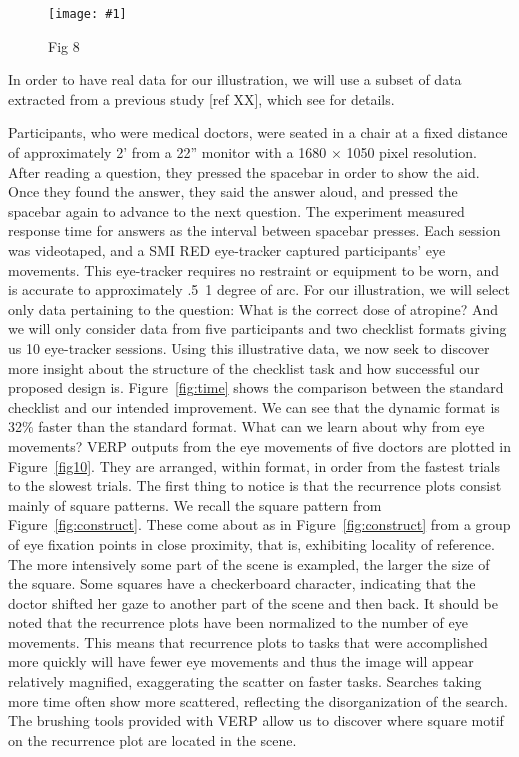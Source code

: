 \documentclass{sigchi}
\newcommand{\insertpicture}[2]{\begin{center}\texttt{[image: \#1]}\end{center}}
\begin{document}
\begin{figure}
\insertpicture{figures/dummy.eps}{0.5}
\caption{Fig 8 \label{Fig8}} 
\end{figure}

In order to have real data for our illustration, we will use a subset of
data extracted from a previous study [ref XX], which see for 
details.

Participants, who were medical doctors, were seated in a chair at a fixed
distance of approximately 2' from a 22'' monitor with a 1680 × 1050 pixel
resolution. After reading a question, they pressed the spacebar in order to
show the aid. Once they found the answer, they said the answer aloud, and
pressed the spacebar again to advance to the next question. The experiment
measured response time for answers as the interval between spacebar
presses. Each session was videotaped, and a SMI RED eye-tracker captured
participants’ eye movements. This eye-tracker requires no restraint or
equipment to be worn, and is accurate to approximately .5~1 degree of arc.
For our illustration, we will select only data pertaining to the question:
What is the correct dose of atropine? And we will only consider data from
five participants and two checklist formats giving us 10 eye-tracker
sessions. Using this illustrative data, we now seek to discover more
insight about the structure of the checklist task and how successful our
proposed design is. Figure~\ref{fig:time} shows the comparison between the standard
checklist and our intended improvement. We can see that the dynamic format
is 32\% faster than the standard format. What can we learn about why from
eye movements? VERP outputs from the eye movements of five doctors are
plotted in Figure~\ref{fig10}.  They are arranged, within format, in order from the
fastest trials to the slowest trials. The first thing to notice is that the
recurrence plots consist mainly of square patterns. We recall the square
pattern from Figure~\ref{fig:construct}. These come about as in Figure~\ref{fig:construct} from a group of eye
fixation points in close proximity, that is, exhibiting locality of
reference. The more intensively some part of the scene is exampled, the
larger the size of the square. Some squares have a checkerboard character,
indicating that the doctor shifted her gaze to another part of the scene
and then back. It should be noted that the recurrence plots have been
normalized to the number of eye movements. This means that recurrence plots
to tasks that were accomplished more quickly will have fewer eye movements
and thus the image will appear relatively magnified, exaggerating the
scatter on faster tasks. Searches taking more time often show more
scattered, reflecting the disorganization of the search. The brushing tools
provided with VERP allow us to discover where square motif on the
recurrence plot are located in the scene.
\end{document}
